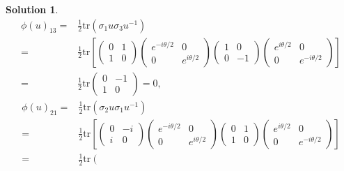 \documentclass[UTF8,10pt,a4paper]{article}
\theoremstyle{Problem}
\theoremstyle{Solution}
\newtheorem*{sol}{Solution}
\begin{document}
\begin{sol}
    \begin{align}
        \nonumber\phi(u)_{13}=&\frac{1}{2}\text{tr}(\sigma_1u\sigma_3u^{-1})\\
        \nonumber=&\frac{1}{2}\text{tr}\left[\left(\begin{matrix}
            0&1\\
            1&0
        \end{matrix}\right)\left(\begin{matrix}
            e^{-i\theta/2}&0\\
            0&e^{i\theta/2}
        \end{matrix}\right)\left(\begin{matrix}
            1&0\\
            0&-1
        \end{matrix}\right)\left(\begin{matrix}
            e^{i\theta/2}&0\\
            0&e^{-i\theta/2}
        \end{matrix}\right)\right]\\
        =&\frac{1}{2}\text{tr}\left(\begin{matrix}
            0&-1\\
            1&0
        \end{matrix}\right)=0,
    \end{align}
    \begin{align}
        \nonumber\phi(u)_{21}=&\frac{1}{2}\text{tr}(\sigma_2u\sigma_1u^{-1})\\
        \nonumber=&\frac{1}{2}\text{tr}\left[\left(\begin{matrix}
            0&-i\\
            i&0
        \end{matrix}\right)\left(\begin{matrix}
            e^{-i\theta/2}&0\\
            0&e^{i\theta/2}
        \end{matrix}\right)\left(\begin{matrix}
            0&1\\
            1&0
        \end{matrix}\right)\left(\begin{matrix}
            e^{i\theta/2}&0\\
            0&e^{-i\theta/2}
        \end{matrix}\right)\right]\\
        =&\frac{1}{2}\text{tr}\left(\begin{matrix}

\end{matrix}
\end{align}
\end{sol}
\end{document}
